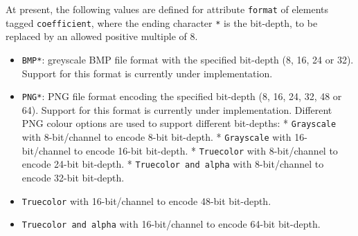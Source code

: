 At present, the following values are defined for attribute
\texttt{format} of elements tagged \texttt{coefficient}, where the
ending character \texttt{*} is the bit-depth, to be replaced by an
allowed positive multiple of 8.
\begin{itemize}
\item \texttt{BMP*}: greyscale BMP file
format with the specified bit-depth (8, 16, 24 or 32). Support for this
format is currently under implementation.
\item \texttt{PNG*}: PNG file
format encoding the specified bit-depth (8, 16, 24, 32, 48 or 64).
Support for this format is currently under implementation. Different PNG
colour options are used to support different bit-depths: *
\texttt{Grayscale} with 8-bit/channel to encode 8-bit bit-depth. *
\texttt{Grayscale} with 16-bit/channel to encode 16-bit bit-depth. *
\texttt{Truecolor} with 8-bit/channel to encode 24-bit bit-depth. *
\texttt{Truecolor\ and\ alpha} with 8-bit/channel to encode 32-bit
bit-depth.
\item \texttt{Truecolor} with 16-bit/channel to encode 48-bit
bit-depth.
\item \texttt{Truecolor\ and\ alpha} with 16-bit/channel to
encode 64-bit bit-depth.
\end{itemize}
